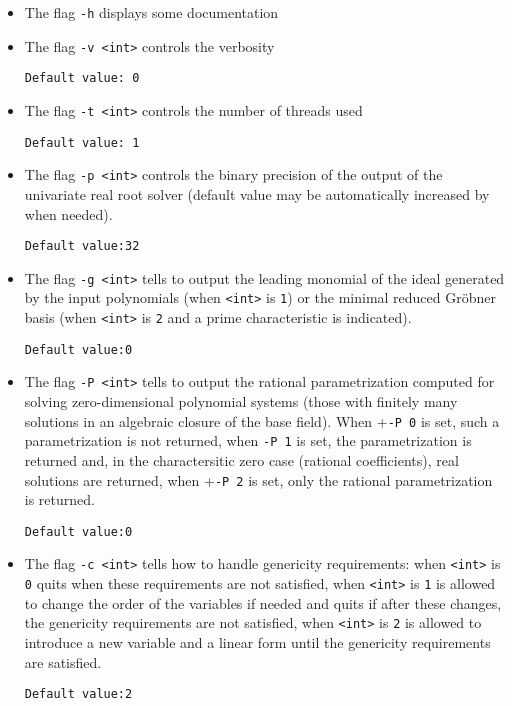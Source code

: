 \documentclass[a4paper,english,11pt]{scrartcl}
\theoremstyle{definition}
\theoremstyle{remark}
\begin{document}
\begin{itemize}
\item The flag \verb+-h+ displays some documentation

\item The flag \verb+-v <int>+ controls the verbosity

  \hfill \verb+Default value: 0+

\item The flag \verb+-t <int>+ controls the number of threads used

  \hfill \verb+Default value: 1+

\item The flag \verb+-p <int>+ controls the binary precision of the output of the 
    univariate real root
    solver (default value may be automatically increased by \msolve when needed).

    \hfill \verb+Default value:32+
\item The flag \verb+-g <int>+ tells \msolve to output the leading monomial of
  the ideal generated by the input polynomials (when \verb+<int>+ is \verb+1+)
  or the minimal reduced Gr\"obner basis (when \verb+<int>+ is \verb+2+ and
  a prime characteristic is indicated).

  \hfill \verb+Default value:0+

\item The flag \verb+-P <int>+ tells \msolve to output the 
rational parametrization computed for solving zero-dimensional polynomial 
systems (those with finitely many solutions in an algebraic closure of the base field).
When +\verb+-P 0+ is set, such a parametrization is not returned, when \verb+-P 1+ is
set, the parametrization is returned and, in the charactersitic zero case (rational 
coefficients), real solutions are returned, when +\verb+-P 2+ is set, only the 
rational parametrization is returned.

  \hfill \verb+Default value:0+


\item The flag \verb+-c <int>+ tells \msolve how to handle genericity
  requirements: when \verb+<int>+ is \verb+0+ \msolve quits when these
  requirements are not satisfied, when \verb+<int>+ is \verb+1+ \msolve is
  allowed to change the order of the variables if needed and quits if after
  these changes, the genericity requirements are not satisfied,  when
  \verb+<int>+ is \verb+2+ \msolve is allowed to introduce a new variable and a
  linear form until the genericity requirements are satisfied. 

  \hfill \verb+Default value:2+

\end{itemize}
\end{document}
